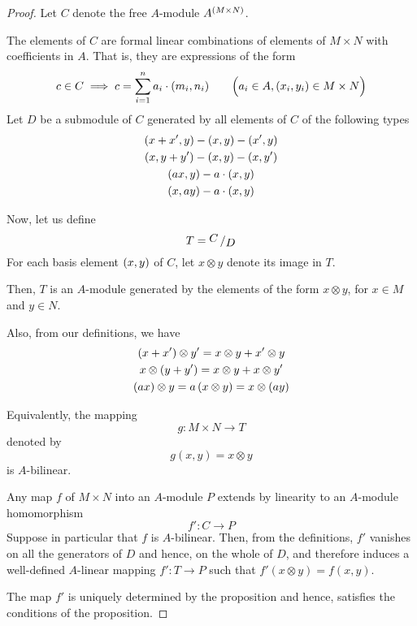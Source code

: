\begin{proof}{}{}
	Let \(C\) denote the free \(A\)-module \(A^{\left( M \times N \right)}\).

	The elements of \(C\) are formal linear combinations of elements
	of \(M \times N\) with coefficients in \(A\).
	That is, they are expressions of the form
	\[
		c \in C \implies c =
		\sum_{i=1}^n a_i \cdot (m_i, n_i)
		\quad\quad \Big{(} a_i \in A, (x_i, y_i) \in M \times N \Big{)}
	\]
	Let \(D\) be a submodule of \(C\) generated by all elements of \(C\)
	of the following types
	\begin{gather*}
		\left( x + x', y \right) - \left( x, y \right) - \left( x', y \right) \\
		\left( x, y + y' \right) - \left( x, y \right) - \left( x, y' \right) \\
		\left( ax, y \right) - a \cdot \left( x, y \right) \\
		\left( x, ay \right) - a \cdot \left( x, y \right)
	\end{gather*}

	Now, let us define
	\[
		T = \bigslant{C}{D}
	\]
	For each basis element \(\left( x, y \right)\) of \(C\), let
	\(x \otimes y\) denote its image in \(T\).

	Then, \(T\) is an \(A\)-module generated by the elements of the form
	\(x \otimes y\), for \(x \in M\) and \(y \in N\).

	Also, from our definitions, we have
	\begin{gather*}
		\left( x + x' \right) \otimes y' = x \otimes y + x' \otimes y \\
		x \otimes \left( y + y' \right) = x \otimes y + x \otimes y' \\
		\left( ax \right) \otimes y = a \left( x \otimes y \right) = x \otimes \left( ay \right)
	\end{gather*}

	Equivalently, the mapping
	\[
		g \colon M \times N \to T
	\]
	denoted by
	\[
		g(x, y) = x \otimes y
	\]
	is \(A\)-bilinear.

	Any map \(f\) of \(M \times N\) into an \(A\)-module \(P\) extends
	by linearity to an \(A\)-module homomorphism
	\[
		f' \colon C \to P
	\]
	Suppose in particular that \(f\) is \(A\)-bilinear.
	Then, from the definitions, \(f'\) vanishes on all the generators
	of \(D\) and hence, on the whole of \(D\), and therefore induces
	a well-defined \(A\)-linear mapping \(f' \colon T \to P\)
	such that \(f'(x \otimes y) = f(x, y)\).

	The map \(f'\) is uniquely determined by the proposition and hence,
	satisfies the conditions of the proposition.
\end{proof}

